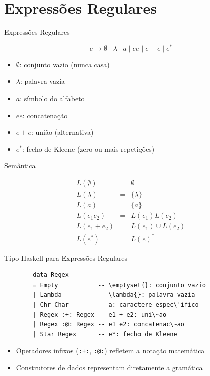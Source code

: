 \section{Expressões Regulares}\label{expressuxf5es-regulares}

\begin{frame}{Expressões Regulares}

    \[e \to \emptyset \mid \lambda \mid a \mid ee \mid e+e \mid e^*\]

    \begin{itemize}

        \item
        \(\emptyset\): conjunto vazio (nunca casa)
        \item
        \(\lambda\): palavra vazia
        \item
        \(a\): símbolo do alfabeto
        \item
        \(ee\): concatenação
        \item
        \(e+e\): união (alternativa)
        \item
        \(e^*\): fecho de Kleene (zero ou mais repetições)
    \end{itemize}
\end{frame}

\begin{frame}{Semântica}

    \[\begin{array}{lcl}
    L(\emptyset) &=& \emptyset \\
    L(\lambda) &=& \{\lambda\} \\
    L(a) &=& \{a\} \\
    L(e_1 e_2) &=& L(e_1)L(e_2) \\
    L(e_1 + e_2) &=& L(e_1) \cup L(e_2) \\
    L(e^*) &=& L(e)^*
\end{array}\]
\end{frame}

\begin{frame}[fragile]{Tipo Haskell para Expressões Regulares}

    \begin{lstlisting}
        data Regex
        = Empty           -- \emptyset{}: conjunto vazio
        | Lambda          -- \lambda{}: palavra vazia
        | Chr Char        -- a: caractere espec\'ifico
        | Regex :+: Regex -- e1 + e2: uni\~ao
        | Regex :@: Regex -- e1 e2: concatenac\~ao
        | Star Regex      -- e*: fecho de Kleene
    \end{lstlisting}

    \begin{itemize}

        \item
        Operadores infixos (\texttt{:+:},
        \texttt{:@:}) refletem a notação matemática
        \item
        Construtores de dados representam diretamente a gramática
    \end{itemize}
\end{frame}


